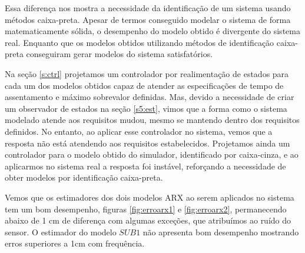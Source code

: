 Essa diferença nos mostra a necessidade da identificação de um sistema usando métodos caixa-preta. Apesar de termos conseguido modelar o sistema de forma matematicamente sólida, o desempenho do modelo obtido é divergente do sistema real. Enquanto que os modelos obtidos utilizando métodos de identificação caixa-preta conseguiram gerar modelos do sistema satisfatórios. 


Na seção \ref{s:ctrl} projetamos um controlador por realimentação de estados para cada um dos modelos obtidos capaz de atender as especificações de tempo de assentamento e máximo sobrevalor definidas. Mas, devido a necessidade de criar um observador de estados na seção \ref{s5:est}, vimos que a forma como o sistema modelado atende aos requisitos mudou, mesmo se mantendo dentro dos requisitos definidos. No entanto, ao aplicar esse controlador no sistema, vemos que a resposta não está atendendo aos requisitos estabelecidos. Projetamos ainda um controlador para o modelo obtido do simulador, identificado por caixa-cinza, e ao aplicarmos no sistema real a resposta foi instável, reforçando a necessidade de obter modelos por identificação caixa-preta.


Vemos que os estimadores dos dois modelos ARX ao serem aplicados no sistema tem um bom desempenho, figuras \ref{fig:erroarx1} e \ref{fig:erroarx2}, permanecendo abaixo de 1 cm de diferença com algumas exceções, que atribuímos ao ruído do sensor. O estimador do modelo $SUB1$ não apresenta bom desempenho mostrando erros superiores a 1cm com frequência.








